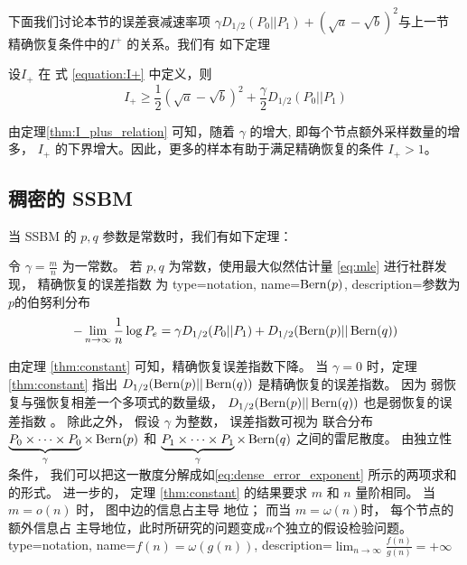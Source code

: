 下面我们讨论本节的误差衰减速率项
$\gamma D_{1/2}(P_0||P_1) +
(\sqrt{a} - \sqrt{b})^2$与上一节
精确恢复条件中的$I^+$ 的关系。我们有
如下定理
\begin{theorem}\label{thm:I_plus_relation}
    设$I_+$ 在 式 \eqref{equation:I+}
    中定义，则
    \begin{equation}
        I_+ \geq \frac{1}{2}
        (\sqrt{a} - \sqrt{b})^2 +
        \frac{\gamma}{2} D_{1/2}(P_0||P_1)
    \end{equation}
\end{theorem}
	由定理\ref{thm:I_plus_relation}
    可知，随着  $\gamma$ 的增大, 即每个节点额外采样数量的增多， $I_+$
    的下界增大。因此，更多的样本有助于满足精确恢复的条件 $I_+>1$。 

\subsection{稠密的 SSBM}
当 SSBM 的 $p,q$ 参数是常数时，我们有如下定理：
\begin{theorem}\label{thm:constant}
	令 $\gamma = \frac{m}{n}$ 为一常数。
    若 $p,q$ 为常数，使用最大似然估计量 \eqref{eq:mle}
    进行社群发现，
	精确恢复的误差指数
    为
{
  type=notation,
  name={$\operatorname{Bern}(p)$},
  description={参数为$p$的伯努利分布}
}
	\begin{equation}\label{eq:dense_error_exponent}
	-\lim_{n\to \infty} \frac{1}{n}\log P_e = 
     \gamma D_{1/2}(P_0 || P_1) + D_{1/2}(\operatorname{Bern}(p)||\operatorname{Bern}(q))
	\end{equation} 
\end{theorem}

由定理 \ref{thm:constant} 可知，精确恢复误差指数下降。
当 $\gamma=0$ 时，定理 \ref{thm:constant} 指出
$D_{1/2}(\operatorname{Bern}(p)||\operatorname{Bern}(q))$
是精确恢复的误差指数。
因为
弱恢复与强恢复相差一个多项式的数量级，
$D_{1/2}(\operatorname{Bern}(p)||\operatorname{Bern}(q))$ 也是弱恢复的误差指数
\cite{zhang2016}。
除此之外， 假设 $\gamma$ 为整数，
误差指数可视为 
联合分布
$\underbrace{P_0\times \dots \times P_0}_{\gamma} \times \Bern(p)$
和 $\underbrace{P_1\times \dots \times P_1}_{\gamma} \times \Bern(q)$
之间的雷尼散度。
由独立性条件，
我们可以把这一散度分解成如\eqref{eq:dense_error_exponent}
所示的两项求和的形式。
进一步的， 定理 \ref{thm:constant}
的结果要求
$m$ 和 $n$ 量阶相同。
当 $m=o(n)$ 时，
图中边的信息占主导
地位；
而当 $m=\omega(n)$时，
每个节点的额外信息占
主导地位，此时所研究的问题变成$n$个独立的假设检验问题。
{
  type=notation,
  name={$f(n)=\omega(g(n))$},
  description={$\lim_{n\to \infty} \frac{f(n)}{g(n)} = +\infty$}
}

